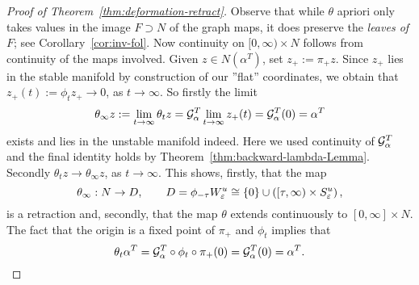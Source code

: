 \documentclass{article}
\begin{document}
\begin{proof}[Proof of Theorem~\ref{thm:deformation-retract}]
Observe that while $\theta$ apriori only takes values in the image
$F\supset N$ of the graph maps,
it does preserve the \emph{leaves of $F$}; see Corollary~\ref{cor:inv-fol}.
Now continuity on $[0,\infty)\times N$ follows from continuity of the maps involved.
Given $z\in N(\alpha^T)$, set $z_+:=\pi_+ z$. Since $z_+$ lies in the
stable manifold by construction of our ''flat'' coordinates,
we obtain that $z_+(t):=\phi_t z_+\to 0$, as $t\to\infty$. So firstly the limit
\begin{equation*}
     \theta_\infty z
     :=\lim_{t\to\infty} \theta_t z
     ={\mathcal{G}}^T_\alpha\lim_{t\to\infty}z_+(t)
     ={\mathcal{G}}^T_\alpha(0)
     =\alpha^T
\end{equation*}
exists and lies in the unstable manifold indeed. Here we used continuity of ${\mathcal{G}}^T_\alpha$
and the final identity holds by Theorem~\ref{thm:backward-lambda-Lemma}.
%
Secondly $\theta_t z\to\theta_\infty z$, as $t\to\infty$. This shows, firstly, that the map
\begin{equation}\label{eq:strong-def-retract}
     \theta_\infty:N\to D
     ,\qquad
     D=\phi_{-\tau} W^u_\eps
     \cong\{0\}\cup\left([\tau,\infty)\times S^u_\eps\right),
\end{equation}
is a retraction and, secondly, that the map $\theta$ extends continuously to $[0,\infty]\times N$.
The fact that the origin is a fixed point of $\pi_+$ and $\phi_t$ implies that
\begin{equation*}
     \theta_t\alpha^T={\mathcal{G}}^T_\alpha\circ\phi_t\circ\pi_+(0)
     ={\mathcal{G}}^T_\alpha(0)=\alpha^T.
\end{equation*}


\end{proof}
\end{document}

